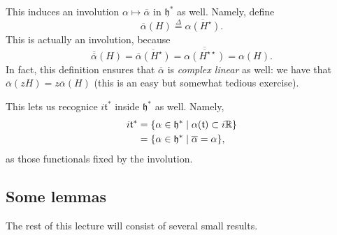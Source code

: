 \documentclass[11pt, english]{article}
\begin{document}
This induces an involution $\alpha \mapsto \overline \alpha$ in $\mathfrak h^\ast$ as well. Namely, define
$$
\overline \alpha(H) \stackrel{\Delta}{=} \overline{\alpha(H^\star)}.
$$
This is actually an involution, because
$$
\overline{\overline \alpha}(H) = \overline{\overline \alpha(H^\star)} = \overline{\overline{\alpha(H^{\star \star})}} = \alpha(H).
$$
In fact, this definition ensures that $\overline{\alpha}$ is \emph{complex linear} as well: we have that $\overline \alpha (zH) = z \overline \alpha(H)$ (this is an easy but somewhat tedious exercise).

This lets us recognice $i \mathfrak t^\ast$ inside $\mathfrak h^\ast$ as well. Namely,
\begin{align*}
  i \mathfrak t^\ast &= \{ \alpha \in \mathfrak h^\ast \mid \alpha(\mathfrak t) \subset i \mathbb{R} \} \\
&= \{ \alpha \in \mathfrak h ^\ast \mid \overline \alpha = \alpha \},
\end{align*}
as those functionals fixed by the involution.

\subsection{Some lemmas}

The rest of this lecture will consist of several small results.
\end{document}
